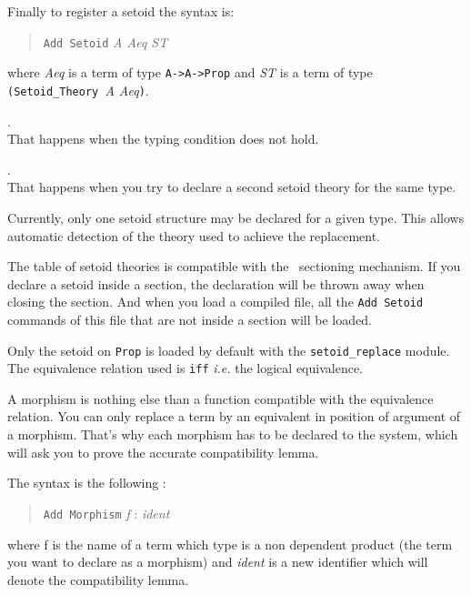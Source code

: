 Finally to register a setoid the syntax is:

\begin{quotation}
  \texttt{Add Setoid} \textit{ A Aeq ST}
\end{quotation}

\noindent where \textit{Aeq} is a term of type \texttt{A->A->Prop} and
\textit{ST} is a term of type 
\texttt{(Setoid\_Theory }\textit{A Aeq}\texttt{)}.

\begin{ErrMsgs}
\item {}.\\ 
  That happens when the typing condition does not hold.
\item {}.\\
  That happens when you try to declare a second setoid theory for the
  same type.
\end{ErrMsgs}

Currently, only one setoid structure
may be declared for a given type.
This allows automatic detection of the theory used to achieve the
replacement.

The table of setoid theories is compatible with the \Coq\ 
sectioning mechanism. If you declare a setoid inside a section, the
declaration will be thrown away when closing the section.
And when you load a compiled file, all the \texttt{Add Setoid}
commands of this file that are not inside a section will be loaded.

\Warning Only the setoid on \texttt{Prop} is loaded by default with the
\texttt{setoid\_replace} module. The equivalence relation used is
\texttt{iff} {\it i.e.} the logical equivalence.


A morphism is nothing else than a function compatible with the
equivalence relation. 
You can only replace a term by an equivalent in position of argument
of a morphism. That's why each morphism has to be
declared to the system, which will ask you to prove the accurate
compatibility lemma.

The syntax is the following :
\begin{quotation}
  \texttt{Add Morphism} \textit{ f }:\textit{ ident}
\end{quotation}

\noindent where f is the name of a term which type is a non dependent
product (the term you want to declare as a morphism) and
\textit{ident} is a new identifier which will denote the
compatibility lemma.

